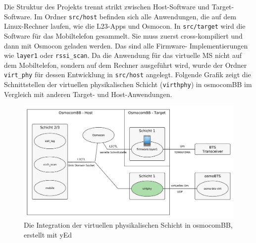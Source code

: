 Die Struktur des Projekts trennt strikt zwischen Host-Software und Target-Software. Im Ordner \texttt{src/host} befinden sich alle Anwendungen, die auf dem Linux-Rechner laufen, wie die L23-Apps und Osmocon. In \texttt{src/target} wird die Software für das Mobiltelefon gesammelt. Sie muss zuerst cross-kompiliert und dann mit Osmocon geladen werden. Das sind alle Firmware- Implementierungen wie \texttt{layer1} oder \texttt{rssi\_scan}. Da die Anwendung für das virtuelle \ac{MS} nicht auf dem Mobiltelefon, sondern auf dem Rechner ausgeführt wird, wurde der Ordner \texttt{virt\_phy} für dessen Entwicklung in \texttt{src/host} angelegt. Folgende Grafik zeigt die Schnittstellen der virtuellen physikalischen Schicht (\texttt{virthphy}) in osmocomBB im Vergleich mit anderen Target- und Host-Anwendungen.

\begin{figure}[H]
	\centering \includegraphics[width=1.0\linewidth]{figures/virt-bb-in-osmocom.pdf}
	\caption[Die Integration der virtuellen physikalischen Schicht in osmocomBB]{Die Integration der virtuellen physikalischen Schicht in osmocomBB, erstellt mit yEd} \label{fig:virt-bb-in-osmocom}
\end{figure}

